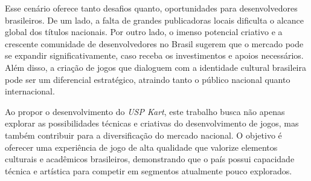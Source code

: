 Esse cenário oferece tanto desafios quanto, oportunidades para desenvolvedores brasileiros. De um lado, a falta de grandes publicadoras locais dificulta o alcance global dos títulos nacionais. Por outro lado, o imenso potencial criativo e a crescente comunidade de desenvolvedores no Brasil sugerem que o mercado pode se expandir significativamente, caso receba os investimentos e apoios necessários. Além disso, a criação de jogos que dialoguem com a identidade cultural brasileira pode ser um diferencial estratégico, atraindo tanto o público nacional quanto internacional.

Ao propor o desenvolvimento do \textit{USP Kart}, este trabalho busca não apenas explorar as possibilidades técnicas e criativas do desenvolvimento de jogos, mas também contribuir para a diversificação do mercado nacional. O objetivo é oferecer uma experiência de jogo de alta qualidade que valorize elementos culturais e acadêmicos brasileiros, demonstrando que o país possui capacidade técnica e artística para competir em segmentos atualmente pouco explorados.